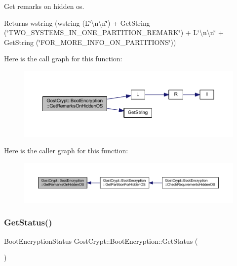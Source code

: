 Get remarks on hidden os. 

\begin{DoxyReturn}{Returns}
wstring (wstring (L\char`\"{}\textbackslash{}n\textbackslash{}n\char`\"{}) + Get\+String (\char`\"{}\+T\+W\+O\+\_\+\+S\+Y\+S\+T\+E\+M\+S\+\_\+\+I\+N\+\_\+\+O\+N\+E\+\_\+\+P\+A\+R\+T\+I\+T\+I\+O\+N\+\_\+\+R\+E\+M\+A\+R\+K\char`\"{}) + L\char`\"{}\textbackslash{}n\textbackslash{}n\char`\"{} + Get\+String (\char`\"{}\+F\+O\+R\+\_\+\+M\+O\+R\+E\+\_\+\+I\+N\+F\+O\+\_\+\+O\+N\+\_\+\+P\+A\+R\+T\+I\+T\+I\+O\+N\+S\char`\"{})) 
\end{DoxyReturn}
Here is the call graph for this function\+:
\nopagebreak
\begin{figure}[H]
\begin{center}
\leavevmode
\includegraphics[width=350pt]{class_gost_crypt_1_1_boot_encryption_aaca146556fbaac863e487cdabcad4678_cgraph}
\end{center}
\end{figure}
Here is the caller graph for this function\+:
\nopagebreak
\begin{figure}[H]
\begin{center}
\leavevmode
\includegraphics[width=350pt]{class_gost_crypt_1_1_boot_encryption_aaca146556fbaac863e487cdabcad4678_icgraph}
\end{center}
\end{figure}
\mbox{\label{class_gost_crypt_1_1_boot_encryption_a55499453ff60a4484743a7f286702cba}} 
\subsubsection{\texorpdfstring{Get\+Status()}{GetStatus()}}
{\footnotesize\ttfamily Boot\+Encryption\+Status Gost\+Crypt\+::\+Boot\+Encryption\+::\+Get\+Status (\begin{DoxyParamCaption}{ }\end{DoxyParamCaption})}



